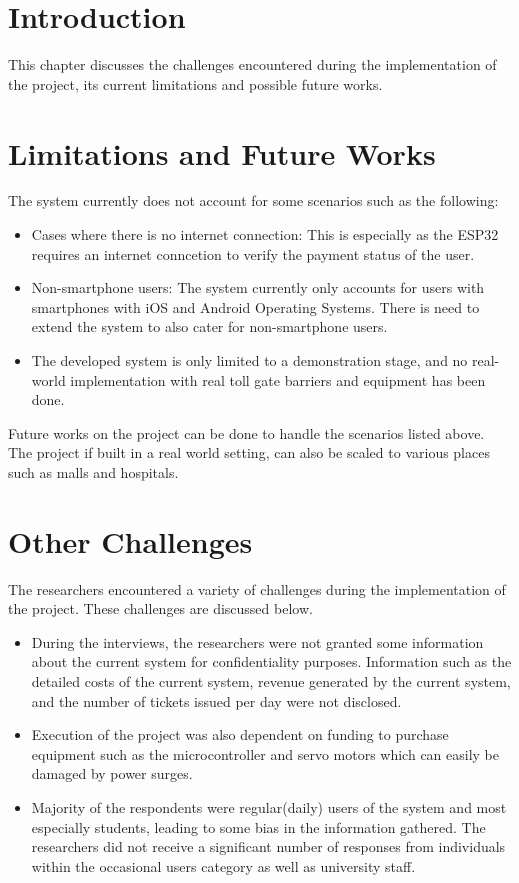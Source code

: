 \section{Introduction}
This chapter discusses the challenges encountered during the implementation of the project, its current limitations and possible future works.


\section{Limitations and Future Works}
The system currently does not account for some scenarios such as the following:
\begin{itemize}
    \item Cases where there is no internet connection: This is especially as the ESP32 requires an internet conncetion to verify the payment status of the user.
    \item Non-smartphone users: The system currently only accounts for users with smartphones with iOS and Android Operating Systems. There is need to extend the system to also cater for non-smartphone users.
    \item The developed system is only limited to a demonstration stage, and no real-world implementation with real toll gate barriers and equipment has been done.
\end{itemize}

Future works on the project can be done to handle the scenarios listed above. The project if built in a real world setting,  can also be scaled to various places such as malls and hospitals.


\section{Other Challenges}
The researchers encountered a variety of challenges during the implementation of the project. These challenges are discussed below.

\begin{itemize}
    \item During the interviews, the researchers were not granted some information about the current system for confidentiality purposes. Information such as the detailed costs of the current system, revenue generated by the current system, and the number of tickets issued per day were not disclosed.
    \item Execution of the project was also dependent on funding to purchase equipment such as the microcontroller and servo motors which can easily be damaged by power surges.
    \item Majority of the respondents were regular(daily) users of the system and most especially students, leading to some bias in the information gathered. The researchers did not receive a significant number of responses from individuals within the occasional users category as well as university staff.
\end{itemize}


